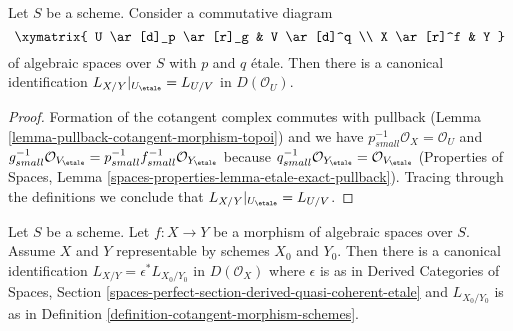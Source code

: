 \begin{lemma}
\label{lemma-etale-localization}
Let $S$ be a scheme. Consider a commutative diagram
$$
\xymatrix{
U \ar[d]_p \ar[r]_g & V \ar[d]^q \\
X \ar[r]^f & Y
}
$$
of algebraic spaces over $S$ with $p$ and $q$ \'etale.
Then there is a canonical identification
$L_{X/Y}|_{U_\etale} = L_{U/V}$ in $D(\mathcal{O}_U)$.
\end{lemma}

\begin{proof}
Formation of the cotangent complex commutes with pullback
(Lemma \ref{lemma-pullback-cotangent-morphism-topoi}) and
we have $p_{small}^{-1}\mathcal{O}_X = \mathcal{O}_U$ and
$g_{small}^{-1}\mathcal{O}_{V_\etale} =
p_{small}^{-1}f_{small}^{-1}\mathcal{O}_{Y_\etale}$
because $q_{small}^{-1}\mathcal{O}_{Y_\etale} =
\mathcal{O}_{V_\etale}$
(Properties of Spaces, Lemma
\ref{spaces-properties-lemma-etale-exact-pullback}).
Tracing through the definitions we conclude that
$L_{X/Y}|_{U_\etale} = L_{U/V}$.
\end{proof}

\begin{lemma}
\label{lemma-compare-spaces-schemes}
Let $S$ be a scheme. Let $f : X \to Y$ be a morphism of algebraic spaces
over $S$. Assume $X$ and $Y$ representable by schemes $X_0$ and $Y_0$.
Then there is a canonical identification
$L_{X/Y} = \epsilon^*L_{X_0/Y_0}$ in $D(\mathcal{O}_X)$
where $\epsilon$ is as in Derived Categories of Spaces, Section
\ref{spaces-perfect-section-derived-quasi-coherent-etale}
and $L_{X_0/Y_0}$ is as in
 Definition \ref{definition-cotangent-morphism-schemes}.
\end{lemma}

